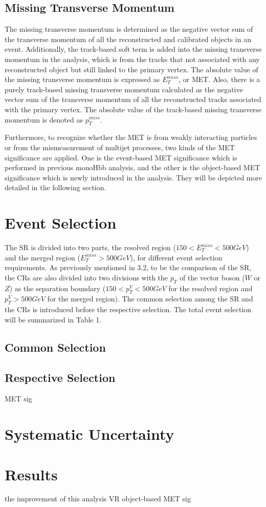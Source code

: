 \documentclass[class=NTHU_thesis, crop=false]{standalone}
\begin{document}
\subsection{Missing Transverse Momentum}
The missing transverse momentum is determined as the negative vector sum of the transverse momentum of all the reconstructed and calibrated objects in an event. Additionally, the track-based soft term is added into the missing transverse momentum in the analysis, which is from the tracks that not associated with any reconstructed object but still linked to the primary vertex. The absolute value of the missing transverse momentum is expressed as $E^{miss}_T$, or MET. Also, there is a purely track-based missing transverse momentum calculated as the negative vector sum of the transverse momentum of all the reconstructed tracks associated with the primary vertex. The absolute value of the track-based missing transverse momentum is denoted as $p^{miss}_T$.

Furthermore, to recognize whether the MET is from weakly interacting particles or from the mismeasurement of multijet processes, two kinds of the MET significance are applied. One is the event-based MET significance which is performed in previous monoHbb analysis, and the other is the object-based MET significance which is newly introduced in the analysis. They will be depicted more detailed in the following section.

\section{Event Selection}
The SR is divided into two parts, the resolved region ($150 < E^{miss}_T < 500 GeV$) and the merged region ($E^{miss}_T > 500 GeV$), for different event selection requirements. As previously mentioned in 3.2, to be the comparison of the SR, the CRs are also divided into two divisions with the $p_T$ of the vector boson ($W$ or $Z$) as the separation boundary ($150 < p^V_T < 500 GeV$ for the resolved region and $p^V_T > 500 GeV$ for the merged region). The common selection among the SR and the CRs is introduced before the respective selection. The total event selection will be summarized in Table 1.

\subsection{Common Selection}


\subsection{Respective Selection}

MET sig

\section{Systematic Uncertainty}

\section{Results}
the improvement of this analysis
VR
object-based MET sig
\end{document}
